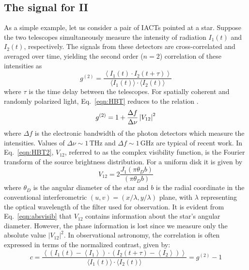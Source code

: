 \subsection{The signal for II}\label{sec:signal}
As a simple example, let us consider a pair of IACTs pointed at a star. Suppose the two telescopes simultaneously measure the intensity of radiation $I_1(t)$ and $I_2(t)$, respectively. The signals from these detectors are cross-correlated and averaged over time, yielding the second order ($n=2$) correlation of these intensities as \citep[cf.][]{acciari2020optical, 2013APh....43..331D}
\begin{equation}
	g^{(2)}= \frac{\left\langle I_1(t) \cdot I_2(t + \tau) \right\rangle}{\langle I_1(t) \rangle \cdot \langle I_2(t) \rangle} 
	\label{eqn:HBT}
\end{equation}
where $\tau$ is the time delay between the telescopes. For spatially coherent and randomly polarized light, Eq.~\eqref{eqn:HBT} reduces to the relation \citep[sometimes called the Siegert relation, see e.g.,][]{acciari2020optical}.
\begin{equation}
	g^{(2)} = 1 + \frac{\Delta f}{\Delta \nu} \abs{V_{12}}^2
	\label{eqn:HBT2}
\end{equation}
where $\Delta f$ is the electronic bandwidth of the photon detectors which measure the intensities.  Values of $\Delta\nu\sim 1\,\mathrm{THz}$ and $\Delta f \sim 1\,\mathrm{GHz}$ are typical of recent work.  In Eq.~\eqref{eqn:HBT2}, $V_{12}$, referred to as the complex visibility function, is the Fourier transform of the source brightness distribution. For a uniform disk it is given by
\begin{equation}
 V_{12} = 2 \frac{J_1(\pi\theta_D b)}{(\pi\theta_D b)}
\label{eqn:absvisib}
\end{equation}
where $\theta_D$ is the angular diameter of the star and $b$ is the radial coordinate in the conventional interferometric $(u , v) = (x/\lambda, y/\lambda)$ plane, with $\lambda$ representing the optical wavelength of the filter used for observation. It is evident from Eq.~\eqref{eqn:absvisib} that $V_{12}$ contains information about the star's angular diameter. However, the phase information is lost since we measure only the absolute value $\vert V_{12} \vert^2$. In observational astronomy, the correlation is often expressed in terms of the normalized contrast, given by:
\begin{equation}
	c = \frac{\left\langle \left( I_1(t) - \left\langle I_1 \right\rangle \right) \cdot \left( I_2(t + \tau) - \left\langle I_2 \right\rangle \right) \right\rangle}{\langle I_1(t) \rangle \cdot \langle I_2(t) \rangle} = g^{(2)} - 1
\end{equation}
